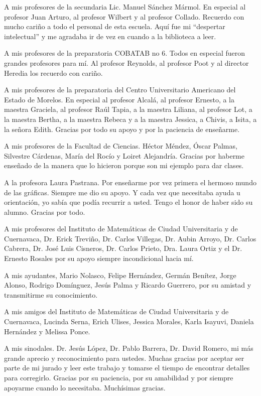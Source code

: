 A mis profesores de la secundaria Lic. Manuel Sánchez Mármol. En especial al profesor Juan Arturo, al profesor Wilbert y al profesor Collado. Recuerdo con mucho cariño a todo el personal de esta escuela. Aquí fue mi ``despertar intelectual” y me agradaba ir de vez en cuando a la biblioteca a leer.


A mis profesores de la preparatoria COBATAB no 6. Todos en especial fueron grandes profesores para mí. Al profesor Reynolds, al profesor Poot y al director Heredia los recuerdo con cariño.


A mis profesores de la preparatoria del Centro Universitario Americano del Estado de Morelos. En especial al profesor Alcalá, al profesor Ernesto, a la maestra Graciela, al profesor Raúl Tapia, a la maestra Liliana, al profesor Lot, a la maestra Bertha, a la maestra Rebeca y a la maestra Jessica, a Chivis, a Isita, a la señora Edith. Gracias por todo su apoyo y por la paciencia de enseñarme.


A mis profesores de la Facultad de Ciencias. Héctor Méndez, Óscar Palmas, Silvestre Cárdenas, María del Rocío y Loiret Alejandría. Gracias por haberme enseñado de la manera que lo hicieron porque son mi ejemplo para dar clases.


A la profesora Laura Pastrana. Por enseñarme por vez primera el hermoso mundo de las gráficas. Siempre me dio su apoyo. Y cada vez que necesitaba ayuda u orientación, yo sabía que podía recurrir a usted. Tengo el honor de haber sido su alumno. Gracias por todo.


A mis profesores del Instituto de Matemáticas de Ciudad Universitaria y de Cuernavaca, Dr. Erick Treviño, Dr. Carlos Villegas, Dr. Aubin Arroyo, Dr. Carlos Cabrera, Dr. José Luis Cisneros, Dr. Carlos Prieto, Dra. Laura Ortiz y el Dr. Ernesto Rosales por su apoyo siempre incondicional hacia mí.


A mis ayudantes, Mario Nolasco, Felipe Hernández, Germán Benítez, Jorge Alonso, Rodrigo Domínguez, Jesús Palma y Ricardo Guerrero, por su amistad y transmitirme su conocimiento. 


A mis amigos del Instituto de Matemáticas de Ciudad Universitaria y de Cuernavaca, Lucinda Serna, Erich Ulises, Jessica Morales, Karla Isayuvi, Daniela Hernández y Melissa Ponce.


A mis sinodales. Dr. Jesús López, Dr. Pablo Barrera, Dr. David Romero, mi más grande aprecio y reconocimiento para ustedes. Muchas gracias por aceptar ser parte de mi jurado y leer este trabajo y tomarse el tiempo de encontrar detalles para corregirlo. Gracias por su paciencia, por su amabilidad y por siempre apoyarme cuando lo necesitaba. Muchísimas gracias.


